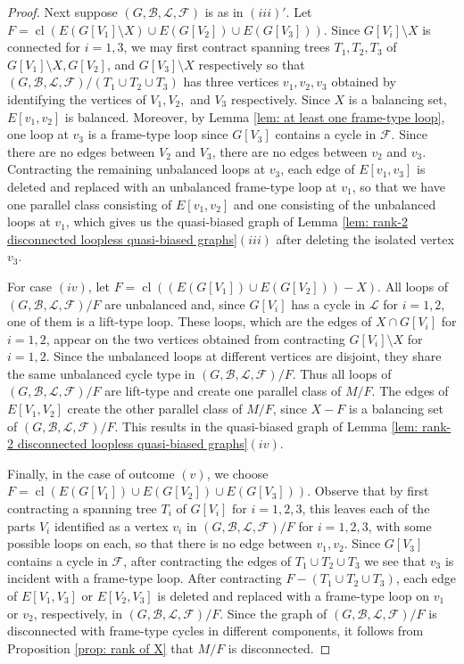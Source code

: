 \documentclass[12pt]{article}
\theoremstyle{definition}
\theoremstyle{plain} %
\newcommand{\cB}{\mathcal{B}}
\newcommand{\cF}{\mathcal{F}}
\newcommand{\cL}{\mathcal{L}}
\DeclareMathOperator{\cl}{cl}
\newcommand{\del}{\!\setminus\!}
\newcommand{\qbg}{\ensuremath{(G,\cB,\cL,\cF)}}
\begin{document}
\begin{proof}
Next suppose $(G,\cB, \cL,\cF)$ is as in $(iii)'$. Let $F=\cl(E(G[V_1]\del X) \cup E(G[V_2])\cup E(G[V_3]))$. Since $G[V_i]\del X$ is connected for $i=1,3$, we may first contract spanning trees $T_1, T_2, T_3$ of $G[V_1]\del X,G[V_2]$, and $G[V_3]\del X$ respectively so that $\qbg/(T_1\cup T_2\cup T_3)$ has three vertices $v_1, v_2, v_3$ obtained by identifying the vertices of $V_1,V_2,$ and $V_3$ respectively. Since $X$ is a balancing set, $E[v_1,v_2]$ is balanced. Moreover, by Lemma \ref{lem: at least one frame-type loop}, one loop at $v_3$ is a frame-type loop since $G[V_3]$ contains a cycle in $\cF$. Since there are no edges between $V_2$ and $V_3$, there are no edges between $v_2$ and $v_3$. Contracting the remaining unbalanced loops at $v_3$, each edge of $E[v_1,v_3]$ is deleted and replaced with an unbalanced frame-type loop at $v_1$, so that we have one parallel class consisting of $E[v_1,v_2]$ and one consisting of the unbalanced loops at $v_1$, which gives us the quasi-biased graph of Lemma \ref{lem: rank-2 disconnected loopless quasi-biased graphs}$(iii)$ after deleting the isolated vertex $v_3$.

For case $(iv)$, let $F=\cl((E(G[V_1]) \cup E(G[V_2]))- X)$. All loops of $\qbg/F$ are unbalanced and, since $G[V_i]$ has a cycle in $\cL$ for $i=1,2$, one of them is a lift-type loop. These loops, which are the edges of $X \cap G[V_i]$ for $i=1,2$, appear on the two vertices obtained from contracting $G[V_i]\del X$ for $i=1,2$. Since the unbalanced loops at different vertices are disjoint, they share the same unbalanced cycle type in $\qbg/F$. Thus all loops of $\qbg/F$ are lift-type and create one parallel class of $M/F$. The edges of $E[V_1,V_2]$ create the other parallel class of $M/F$, since $X-F$ is a balancing set of $(G,\cB,\cL,\cF)/F$. This results in the quasi-biased graph of Lemma \ref{lem: rank-2 disconnected loopless quasi-biased graphs}$(iv)$. 

Finally, in the case of outcome $(v)$, we choose $F=\cl(E(G[V_1])\cup E(G[V_2])\cup E(G[V_3]))$. Observe that by first contracting a spanning tree $T_i$ of $G[V_i]$ for $i = 1,2,3$, this leaves each of the parts $V_i$ identified as a vertex $v_i$ in $\qbg/F$ for $i=1,2,3$, with some possible loops on each, so that there is no edge between $v_1,v_2$. Since $G[V_3]$ contains a cycle in $\cF$, after contracting the edges of $T_1\cup T_2\cup T_3$ we see that $v_3$ is incident with a frame-type loop. After contracting $F-(T_1\cup T_2\cup T_3)$, each edge of $E[V_1,V_3]$ or $E[V_2,V_3]$ is deleted and replaced with a frame-type loop on $v_1$ or $v_2$, respectively, in $\qbg/F$. Since the graph of $\qbg/F$ is disconnected with frame-type cycles in different components, it follows from Proposition \ref{prop: rank of X} that $M/F$ is disconnected. 


\end{proof}
\end{document}
